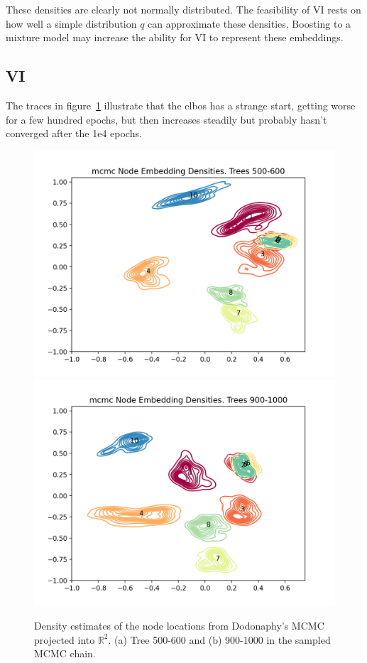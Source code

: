 \documentclass[11pt]{article}
\begin{document}
These densities are clearly not normally distributed.
The feasibility of VI rests on how well a simple distribution $q$ can approximate these densities.
Boosting to a mixture model may increase the ability for VI to represent these embeddings.

\subsection{VI}
The traces in figure~\ref{fig:elbos} illustrate that the elbos has a strange start, getting worse for a few hundred epochs, but then increases steadily but probably hasn’t converged after the 1e4 epochs.
\begin{figure}[htbp]
\begin{center}
\includegraphics[width=.5\linewidth]{fig/locations_500.png}%
\includegraphics[width=.5\linewidth]{fig/locations_900.png}
\caption{Density estimates of the node locations from Dodonaphy's MCMC projected into $\mathbb{R}^{2}$. (a) Tree 500-600 and (b) 900-1000 in the sampled MCMC chain.}
\label{fig:elbos}
\end{center}
\end{figure}
\end{document}
